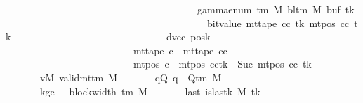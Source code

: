 \begin{isabellebody}
\ \ \ \ \ \ \ \ \ \ \ \ \ \ \ \ \ \ \ \ \ \ \ \ \ \ \ \ \ \ \ \ \ \ \ \ \ {\isacharparenleft}{\kern0pt}{}\ {\isacharasterisk}{\kern0pt}\ gamma{\isacharunderscore}{\kern0pt}enum\ {\isacharparenleft}{\kern0pt}{\isasymGamma}{\isacharunderscore}{\kern0pt}tm\ M{\isacharparenright}{\kern0pt}\ {\isacharparenleft}{\kern0pt}bl{\isacharunderscore}{\kern0pt}tm\ M{\isacharparenright}{\kern0pt}\ {\isacharparenleft}{\kern0pt}buf{\isacharprime}{\kern0pt}\ tk{\isacharparenright}{\kern0pt}\isanewline
\ \ \ \ \ \ \ \ \ \ \ \ \ \ \ \ \ \ \ \ \ \ \ \ \ \ \ \ \ \ \ \ \ \ \ \ \ \ \ \ {\isacharplus}{\kern0pt}\ bit{\isacharunderscore}{\kern0pt}value\ {\isacharparenleft}{\kern0pt}mt{\isacharunderscore}{\kern0pt}tape\ cc\ tk\ {\isacharparenleft}{\kern0pt}mt{\isacharunderscore}{\kern0pt}pos\ cc\ tk{\isacharparenright}{\kern0pt}{\isacharparenright}{\kern0pt}{\isacharparenright}{\kern0pt}{\isacharparenright}{\kern0pt}{\isacharcomma}{\kern0pt}\isanewline
\ \ \ \ \ \ \ \ \ \ \ \ \ \ \ \ \ \ \ \ \ \ \ \ \ \ \ \ \ \ \ dvec{\isacharcomma}{\kern0pt}\ posk{\isacharprime}{\kern0pt}{\isacharparenright}{\kern0pt}\isanewline
\ \ \ \ \ \ \ \ \ \ \ \ \ \ \ \ \ \ \ \ \ \ \ \ \ {\isasymand}\ mt{\isacharunderscore}{\kern0pt}tape\ c{\isacharprime}{\kern0pt}{\isacharprime}{\kern0pt}\ {\isacharequal}{\kern0pt}\ mt{\isacharunderscore}{\kern0pt}tape\ cc\isanewline
\ \ \ \ \ \ \ \ \ \ \ \ \ \ \ \ \ \ \ \ \ \ \ \ \ {\isasymand}\ mt{\isacharunderscore}{\kern0pt}pos\ c{\isacharprime}{\kern0pt}{\isacharprime}{\kern0pt}\ {\isacharequal}{\kern0pt}\ {\isacharparenleft}{\kern0pt}mt{\isacharunderscore}{\kern0pt}pos\ cc{\isacharparenright}{\kern0pt}{\isacharparenleft}{\kern0pt}tk\ {\isacharcolon}{\kern0pt}{\isacharequal}{\kern0pt}\ Suc\ {\isacharparenleft}{\kern0pt}mt{\isacharunderscore}{\kern0pt}pos\ cc\ tk{\isacharparenright}{\kern0pt}{\isacharparenright}{\kern0pt}{\isachardoublequoteclose}\isanewline
\ \ \ \ \ \ \ vM{\isacharcolon}{\kern0pt}\ {\isachardoublequoteopen}valid{\isacharunderscore}{\kern0pt}mttm\ M{\isachardoublequoteclose}\isanewline
\ \ \ \ \ \ \ qQ{\isacharcolon}{\kern0pt}\ {\isachardoublequoteopen}q\ {\isasymin}\ Q{\isacharunderscore}{\kern0pt}tm\ M{\isachardoublequoteclose}\isanewline
\ \ \ \ \ \ \ kge{}{\isacharcolon}{\kern0pt}\ {\isachardoublequoteopen}{}\ {\isasymle}\ block{\isacharunderscore}{\kern0pt}width\ {\isacharparenleft}{\kern0pt}{\isasymGamma}{\isacharunderscore}{\kern0pt}tm\ M{\isacharparenright}{\kern0pt}{\isachardoublequoteclose}\isanewline
\ \ \ \ \ \ \ last{\isacharcolon}{\kern0pt}\ {\isachardoublequoteopen}is{\isacharunderscore}{\kern0pt}last{\isacharunderscore}{\kern0pt}k\ M\ tk{\isachardoublequoteclose}\isanewline

\end{isabellebody}
